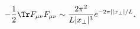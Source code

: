 \begin{equation}
-\frac{1}{2}\Tr F_{\mu\nu}F_{\mu\nu}\sim
\frac{2\pi^2}{L|x_\perp|^3}e^{-2\pi||x_\perp|/L}.
\end{equation}

